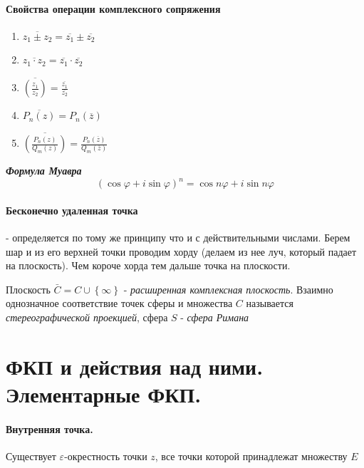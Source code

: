 \documentclass[12pt]{extarticle}
\begin{document}
\paragraph{Свойства операции комплексного сопряжения}
\begin{enumerate}
    \item $\overline{z_{1}\pm z_{2}}=\overline{z_{1}}\pm\overline{z_{2}}$
    \item $\overline{z_{1}\cdot z_{2}}=\overline{z_{1}}\cdot\overline{z_{2}}$
    \item $\overline{\left(\frac{z_{1}}{z_{2}}\right)}
        =\frac{\overline{z_{1}}}{\overline{z_{2}}}$
    \item $\overline{P_{n}(z)}=P_{n}(\overline{z})$
    \item $\overline{\left(\frac{P_{n}(z)}{Q_{m}(z)}\right)}
        =\frac{P_{n}(\overline{z})}{Q_{m}(\overline{z})}$
\end{enumerate}


\par \textbf{\textit{Формула Муавра}}
\begin{displaymath}
    (\cos\varphi+i\sin\varphi)^{n}=\cos n\varphi + i\sin n\varphi
\end{displaymath}

\paragraph{Бесконечно удаленная точка}
- определяется по тому же принципу что и с действительными числами.
Берем шар и из его верхней точки проводим хорду (делаем из нее луч,
который падает на плоскость). Чем короче хорда тем
дальше точка на плоскости.
\par Плоскость $\bar{C}=C\cup\left\{\infty\right\}$ -
\textit{расширенная комплексная плоскость}. Взаимно однозначное соответствие точек сферы и множества
$C$ называется \textit{стереографической проекцией}, сфера $S$ - \textit{сфера
Римана} 

\section{ФКП и действия над ними. Элементарные ФКП.}

\paragraph{Внутренняя точка.} Существует
$\varepsilon$-окрестность точки $z$, все точки которой принадлежат
множеству $E$
\end{document}
